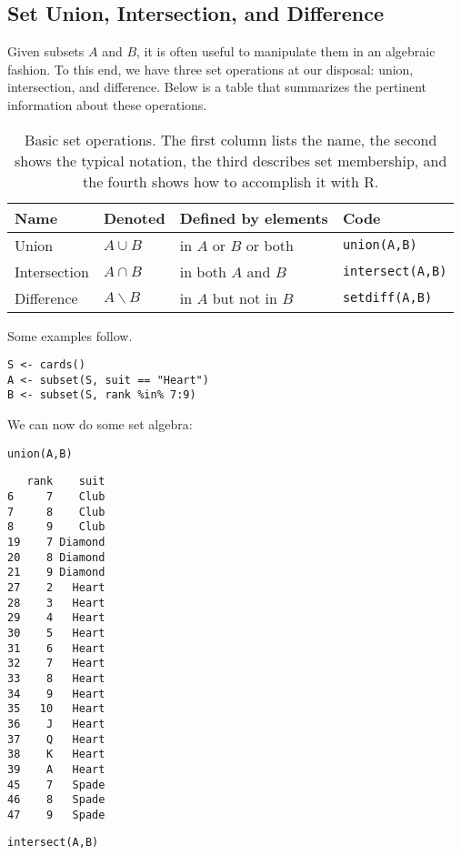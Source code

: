 \subsection{Set Union, Intersection, and Difference}
\label{sec-4-2-3}

Given subsets \(A\) and \(B\), it is often useful to manipulate them
in an algebraic fashion. To this end, we have three set operations at
our disposal: union, intersection, and difference. Below is a table
that summarizes the pertinent information about these operations.

\begin{table}[htb]
\caption[Set operations]{Basic set operations.  The first column lists the name, the second shows the typical notation, the third describes set membership, and the fourth shows how to accomplish it with R.}
\centering
\begin{tabular}{llll}
\hline
Name & Denoted & Defined by elements & Code\\
\hline
Union & \(A\cup B\) & in \(A\) or \(B\) or both & \texttt{union(A,B)}\\
Intersection & \(A\cap B\) & in both \(A\) and \(B\) & \texttt{intersect(A,B)}\\
Difference & \(A\backslash B\) & in \(A\) but not in \(B\) & \texttt{setdiff(A,B)}\\
\hline
\end{tabular}
\end{table}

Some examples follow. 

\begin{verbatim}
S <- cards() 
A <- subset(S, suit == "Heart") 
B <- subset(S, rank %in% 7:9)
\end{verbatim}

We can now do some set algebra: 

\begin{verbatim}
union(A,B)
\end{verbatim}

\begin{verbatim}
   rank    suit
6     7    Club
7     8    Club
8     9    Club
19    7 Diamond
20    8 Diamond
21    9 Diamond
27    2   Heart
28    3   Heart
29    4   Heart
30    5   Heart
31    6   Heart
32    7   Heart
33    8   Heart
34    9   Heart
35   10   Heart
36    J   Heart
37    Q   Heart
38    K   Heart
39    A   Heart
45    7   Spade
46    8   Spade
47    9   Spade
\end{verbatim}

\begin{verbatim}
intersect(A,B)
\end{verbatim}

